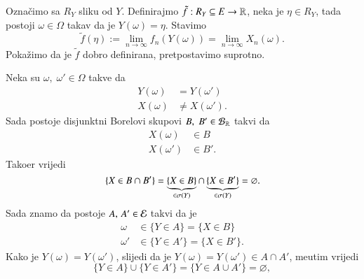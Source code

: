 \begin{rj}[\ref{zad:3.20}]
\begin{itemize}
\begin{enumerate}[label=(\arabic*. korak)]
            Ozna\v cimo sa $R_Y$ sliku od $Y$.
            Definirajmo $\tilde{f} : R_Y \subseteq E \to \mathbb{R}$, neka je $\eta \in R_Y$, tada postoji $\omega \in \Omega$ takav da je $Y(\omega) = \eta$. 
            Stavimo
            \begin{equation*}
                \tilde{f} (\eta) := \lim\limits_{n \to \infty} f_n (Y(\omega)) = \lim\limits_{n \to \infty} X_n (\omega).
            \end{equation*}
            Poka\v zimo da je $\tilde{f}$ dobro definirana, pretpostavimo suprotno.

            Neka su $\omega, \; \omega' \in \Omega$ takve da
            \begin{equation*}
                \begin{aligned}
                    Y(\omega) &= Y(\omega')\\
                    X(\omega) &\neq X(\omega').
                \end{aligned}
            \end{equation*}
            Sada postoje disjunktni Borelovi skupovi $B, \; B' \in \mathcal{B}_{\mathbb{R}}$ takvi da
            \begin{equation*}
                \begin{aligned}
                    X(\omega) &\in B\\
                    X(\omega') &\in B'.
                \end{aligned}
            \end{equation*}
            Tako\dj er vrijedi
            \begin{equation*}
                \{X \in B \cap B'\} = \underbrace{\{X \in B\}}_{\in \sigma({Y})} \cap \underbrace{\{X \in B'\}}_{\in \sigma({Y})} = \varnothing.
            \end{equation*}
            Sada znamo da postoje $A, \, A' \in \mathcal{E}$ takvi da je
            \begin{equation*}
                \begin{aligned}
                    \omega &\in \{Y \in A\} = \{X \in B\}\\
                    \omega' &\in \{Y \in A'\} = \{X \in B'\}.
                \end{aligned}
            \end{equation*}
            Kako je $Y(\omega) = Y (\omega')$, slijedi da je $Y(\omega) = Y(\omega') \in A \cap A'$, me\dj utim vrijedi
            \begin{equation*}
                \{Y \in A\} \cup \{Y \in A'\} = \{Y \in A \cup A'\} = \varnothing,

\end{equation*}
\end{enumerate}
\end{itemize}
\end{rj}
